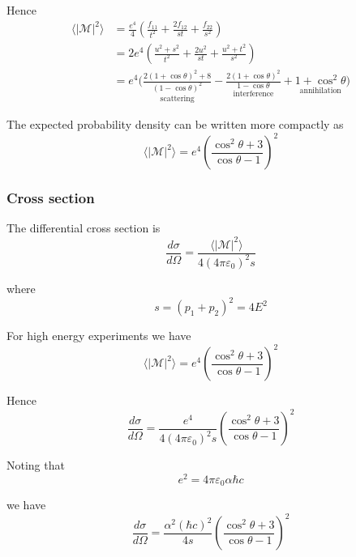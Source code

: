 Hence
\begin{align*}
\langle|\mathcal{M}|^2\rangle
&=\frac{e^4}{4}
\left(\frac{f_{11}}{t^2}+\frac{2f_{12}}{st}+\frac{f_{22}}{s^2}\right)
\\
&=2e^4\left(\frac{u^2+s^2}{t^2}+\frac{2u^2}{st}+\frac{u^2+t^2}{s^2}\right)
\\
&=e^4\biggl(
\underset{\text{scattering}}
{\frac{2(1+\cos\theta)^2+8}{(1-\cos\theta)^2}}
-\underset{\text{interference}}
{\frac{2(1+\cos\theta)^2}{1-\cos\theta}}
+\underset{\text{annihilation}}
{1+\cos^2\theta}
\biggr)
\end{align*}

The expected probability density can be written more compactly as
\begin{equation*}
\langle|\mathcal{M}|^2\rangle=e^4\left(\frac{\cos^2\theta+3}{\cos\theta-1}\right)^2
\end{equation*}

\subsubsection*{Cross section}

The differential cross section is
\begin{equation*}
\frac{d\sigma}{d\Omega}=\frac{\langle|\mathcal{M}|^2\rangle}{4(4\pi\varepsilon_0)^2s}
\end{equation*}

where
\begin{equation*}
s=(p_1+p_2)^2=4E^2
\end{equation*}

For high energy experiments we have
\begin{equation*}
\langle|\mathcal{M}|^2\rangle=e^4\left(\frac{\cos^2\theta+3}{\cos\theta-1}\right)^2
\end{equation*}

Hence
\begin{equation*}
\frac{d\sigma}{d\Omega}=\frac{e^4}{4(4\pi\varepsilon_0)^2s}
\left(\frac{\cos^2\theta+3}{\cos\theta-1}\right)^2
\end{equation*}

Noting that
\begin{equation*}
e^2=4\pi\varepsilon_0\alpha\hbar c
\end{equation*}

we have
\begin{equation*}
\frac{d\sigma}{d\Omega}
=\frac{\alpha^2(\hbar c)^2}{4s}
\left(\frac{\cos^2\theta+3}{\cos\theta-1}\right)^2
\end{equation*}

